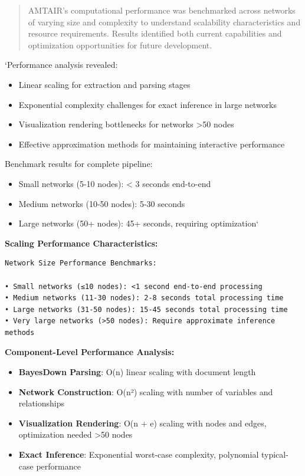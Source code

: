 \documentclass[
  11pt,
  letterpaper,
]{book}
\providecommand{\tightlist}{%
  \setlength{\itemsep}{0pt}\setlength{\parskip}{0pt}}
\begin{document}
\begin{quote}
AMTAIR's computational performance was benchmarked across networks of
varying size and complexity to understand scalability characteristics
and resource requirements. Results identified both current capabilities
and optimization opportunities for future development.
\end{quote}

`Performance analysis revealed:

\begin{itemize}
\tightlist
\item
  Linear scaling for extraction and parsing stages
\item
  Exponential complexity challenges for exact inference in large
  networks
\item
  Visualization rendering bottlenecks for networks \textgreater50 nodes
\item
  Effective approximation methods for maintaining interactive
  performance
\end{itemize}

Benchmark results for complete pipeline:

\begin{itemize}
\tightlist
\item
  Small networks (5-10 nodes): \textless{} 3 seconds end-to-end
\item
  Medium networks (10-50 nodes): 5-30 seconds
\item
  Large networks (50+ nodes): 45+ seconds, requiring optimization`
\end{itemize}

\textbf{Scaling Performance Characteristics:}

\begin{verbatim}
Network Size Performance Benchmarks:

• Small networks (≤10 nodes): <1 second end-to-end processing
• Medium networks (11-30 nodes): 2-8 seconds total processing time
• Large networks (31-50 nodes): 15-45 seconds total processing time
• Very large networks (>50 nodes): Require approximate inference methods
\end{verbatim}

\textbf{Component-Level Performance Analysis:}

\begin{itemize}
\tightlist
\item
  \textbf{BayesDown Parsing}: O(n) linear scaling with document length
\item
  \textbf{Network Construction}: O(n²) scaling with number of variables
  and relationships
\item
  \textbf{Visualization Rendering}: O(n + e) scaling with nodes and
  edges, optimization needed \textgreater50 nodes
\item
  \textbf{Exact Inference}: Exponential worst-case complexity,
  polynomial typical-case performance
\end{itemize}
\end{document}
